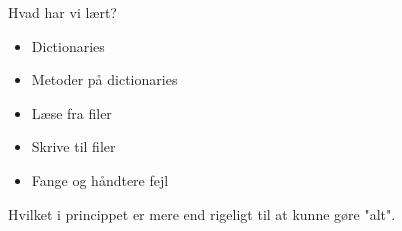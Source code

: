\begin{frame}[fragile]{Hvad har vi lært?}

\begin{itemize}
	\item Dictionaries
	\item Metoder på dictionaries
	\item Læse fra filer
	\item Skrive til filer
	\item Fange og håndtere fejl
\end{itemize}

Hvilket i princippet er mere end rigeligt til at kunne gøre "alt".


\end{frame}
%
%
%
%
%
%
%
%
%
%
%
%

